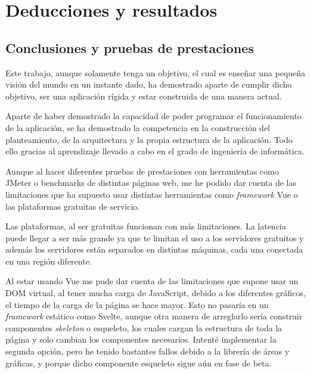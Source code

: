 \chapter{Deducciones y resultados}\label{ch:deducciones}

\section{Conclusiones y pruebas de prestaciones}
Este trabajo, aunque solamente tenga un objetivo, el cual es enseñar una pequeña visión del mundo en un instante dado, ha demostrado aparte de cumplir dicho objetivo, ser una aplicación rígida y estar construida de una manera actual.

\vspace{0.3cm}

Aparte de haber demostrado la capacidad de poder programar el funcionamiento de la aplicación, se ha demostrado la competencia en la construcción del planteamiento, de la arquitectura y la propia estructura de la aplicación. Todo ello gracias al aprendizaje llevado a cabo en el grado de ingeniería de informática.

\vspace{0.3cm}

Aunque al hacer diferentes pruebas de prestaciones con herramientas como JMeter o benchmarks de distintas páginas web, me he podido dar cuenta de las limitaciones que ha supuesto usar distintas herramientas como \textit{framework} Vue o las plataformas gratuitas de servicio.

\vspace{0.3cm}

Las plataformas, al ser gratuitas funcionan con más limitaciones. La latencia puede llegar a ser más grande ya que te limitan el uso a los servidores gratuitos y además los servidores están separados en distintas máquinas, cada una conectada en una región diferente.

\vspace{0.3cm}

Al estar usando Vue me pude dar cuenta de las limitaciones que supone usar un DOM virtual, al tener mucha carga de JavaScript, debido a los diferentes gráficos, el tiempo de la carga de la página se hace mayor. Esto no pasaría en un \textit{framework} estático como Svelte, aunque otra manera de arreglarlo sería construir componentes \textit{skeleton} o esqueleto, los cuales cargan la estructura de toda la página y solo cambian los componentes necesarios. Intenté implementar la segunda opción, pero he tenido bastantes fallos debido a la librería de áreas y gráficas, y porque dicho componente esqueleto sigue aún en fase de beta.

